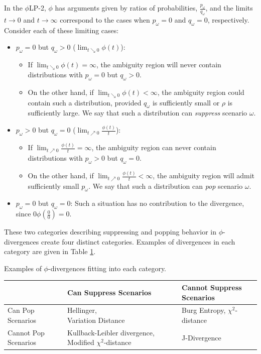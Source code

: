 \documentclass[ijoc,nonblindrev]{informs3} %
\newcommand{\plp}{$\phi$LP-2}
\begin{document}
In the \plp, $\phi$ has arguments given by ratios of probabilities, $\tfrac{p_\omega}{q_\omega}$, and the limits $t \rightarrow 0$ and $t \rightarrow \infty$ correspond to the cases when $p_\omega = 0$ and $q_\omega = 0$, respectively.
Consider each of these limiting cases:
\begin{itemize}
	\item $p_\omega = 0$ but $q_\omega > 0$ ($\lim_{t \searrow 0} \phi(t)$):
	\begin{itemize}
		\item If $\lim_{t \searrow 0} \phi(t) = \infty$, the ambiguity region will never contain distributions with $p_\omega = 0$ but $q_\omega > 0$.
		\item On the other hand, if $\lim_{t \searrow 0} \phi(t) < \infty$, the ambiguity region could contain such a distribution, provided $q_\omega$ is sufficiently small or $\rho$ is sufficiently large.
			We say that such a distribution can \emph{suppress} scenario $\omega$.
	\end{itemize}
	\item $p_\omega > 0$ but $q_\omega = 0$ ($\lim_{t \nearrow 0} \frac{\phi(t)}{t}$):
	\begin{itemize}
		\item If $\lim_{t \nearrow 0} \frac{\phi(t)}{t} = \infty$, the ambiguity region can never contain distributions with $p_\omega > 0$ but $q_\omega = 0$.
		\item On the other hand, if $\lim_{t \nearrow 0} \frac{\phi(t)}{t} < \infty$, the ambiguity region will admit sufficiently small $p_\omega$.
			We say that such a distribution can \emph{pop} scenario $\omega$.
	\end{itemize}
	\item $p_\omega = 0$ but $q_\omega = 0$: Such a situation has no contribution to the divergence, since $0 \phi\left(\tfrac{0}{0}\right) = 0$.
\end{itemize}

These two categories describing suppressing and popping behavior in $\phi$-divergences create four distinct categories.
Examples of divergences in each category are given in Table \ref{tb:phi_categories}.

\begin{table}
	\TABLE
	{
		Examples of $\phi$-divergences fitting into each category.
		\label{tb:phi_categories}
	}
	{\begin{tabular}{l|p{}p{}}
		 & Can Suppress Scenarios & Cannot Suppress Scenarios \\
		 \hline
		 Can Pop Scenarios %
			& \parbox{.33\textwidth}{Hellinger,\\Variation Distance} %
			& \parbox{.33\textwidth}{Burg Entropy,\\$\chi^2$-distance} \smallskip \\
		 Cannot Pop Scenarios %
			& \parbox{.33\textwidth}{Kullback-Leibler divergence,\\Modified $\chi^2$-distance} %
			& \parbox{.33\textwidth}{J-Divergence}
	\end{tabular}}
	{}
\end{table}
\end{document}
